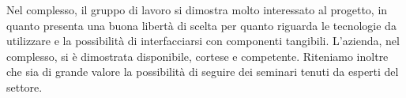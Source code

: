 \documentclass[a4paper, 12pt]{article}
\begin{document}
Nel complesso, il gruppo di lavoro si dimostra molto interessato al progetto, in quanto presenta una buona libertà di scelta per quanto riguarda le tecnologie da utilizzare e la possibilità di interfacciarsi con componenti tangibili. L'azienda, nel complesso, si è dimostrata disponibile, cortese e competente. Riteniamo inoltre che sia di grande valore la possibilità di seguire dei seminari tenuti da esperti del settore.
\end{document}

